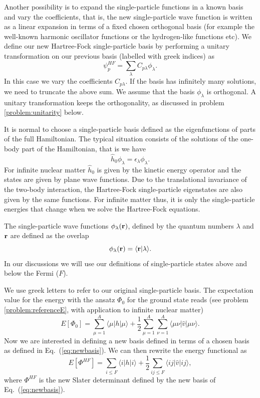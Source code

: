 Another possibility is to expand the single-particle functions in a
known basis and vary the coefficients, that is, the new
single-particle wave function is written as a linear expansion in
terms of a fixed chosen orthogonal basis (for example the well-known
harmonic oscillator functions or the hydrogen-like functions etc).  We
define our new Hartree-Fock single-particle basis by performing a
unitary transformation on our previous basis (labelled with greek
indices) as
\begin{equation}
\psi_p^{HF} = \sum_{\lambda}
C_{p\lambda}\phi_{\lambda}. \label{eq:newbasis}
\end{equation}
In this case we vary the coefficients $C_{p\lambda}$. If the basis has
infinitely many solutions, we need to truncate the above sum.  We
assume that the basis $\phi_{\lambda}$ is orthogonal. A unitary
transformation keeps the orthogonality, as discussed in problem
\ref{problem:unitarity} below.


It is normal to choose a single-particle basis defined as the
eigenfunctions of parts of the full Hamiltonian. The typical situation
consists of the solutions of the one-body part of the Hamiltonian,
that is we have
\[
\hat{h}_0\phi_{\lambda}=\epsilon_{\lambda}\phi_{\lambda}.
\]
For infinite nuclear matter $\hat{h}_0$ is given by the kinetic energy
operator and the states are given by plane wave functions. Due to the
translational invariance of the two-body interaction, the Hartree-Fock
single-particle eigenstates are also given by the same functions. For
infinite matter thus, it is only the single-particle energies that
change when we solve the Hartree-Fock equations.

The single-particle wave functions $\phi_{\lambda}({\bf r})$, defined
by the quantum numbers $\lambda$ and ${\bf r}$ are defined as the
overlap
\[
   \phi_{\lambda}({\bf r}) = \langle {\bf r} | \lambda \rangle .
\]
In our discussions we will use our definitions of single-particle
states above and below the Fermi ($F$).  


We use greek letters to refer to our original single-particle
basis. The expectation value for the energy with the ansatz $\Phi_0$
for the ground state reads (see problem \ref{problem:referenceE}, with
application to infinite nuclear matter)
\[
  E[\Phi_0] = \sum_{\mu=1}^A \langle \mu | h | \mu \rangle +
  \frac{1}{2}\sum_{{\mu}=1}^A\sum_{{\nu}=1}^A \langle
  \mu\nu|\hat{v}|\mu\nu\rangle.
\]
Now we are interested in defining a new basis defined in terms of a
chosen basis as defined in Eq.~(\ref{eq:newbasis}). We can then
rewrite the energy functional as
\begin{equation}
  E[\Phi^{HF}] = \sum_{i\le F} \langle i | h | i \rangle +
  \frac{1}{2}\sum_{ij\le F}\langle
  ij|\hat{v}|ij\rangle, \label{FunctionalEPhi2}
\end{equation}
where $\Phi^{HF}$ is the new Slater determinant defined by the new
basis of Eq.~(\ref{eq:newbasis}).






